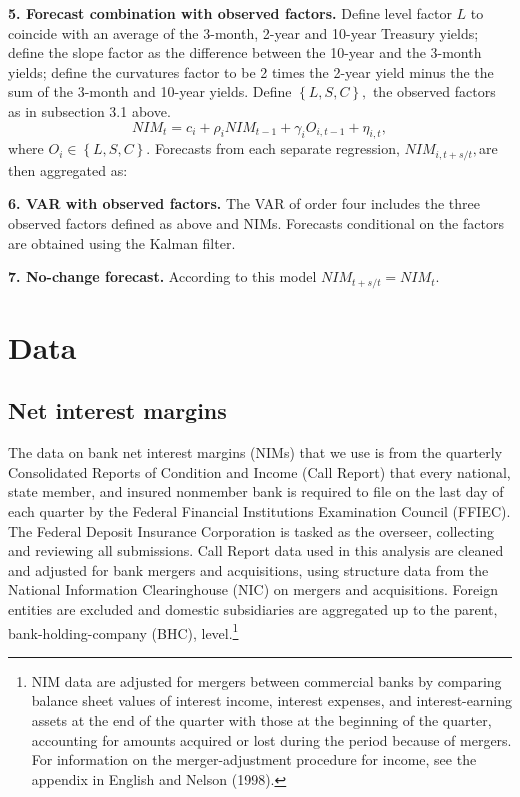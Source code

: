 \documentclass[11pt]{article}
\renewcommand{\baselinestretch}{1.5}
\begin{document}
\begin{frame}

\noindent \textbf{5. Forecast combination with observed factors.} Define level factor $L$ to coincide with an average of the 3-month, 2-year and 10-year Treasury yields; define the slope factor as the difference between the 10-year and the 3-month yields; define the curvatures factor to be 2 times the 2-year yield minus the the sum of the 3-month and 10-year yields. Define $\left\{L,S,C \right\} ,$ the observed factors as in subsection 3.1 above.
\[
NIM_{t}=c_{i}+\rho _{i}NIM_{t-1}+\gamma _{i}O_{i,t-1}+{\eta _{i,t},}
\]%
where $O_{i}\in \left\{ L,S,C\right\} .$ Forecasts  from each separate regression, $NIM_{i,t+s/t},$are then aggregated as:

\noindent \textbf{6. VAR with observed factors.}  The VAR of order four includes the three observed factors defined as above and NIMs. Forecasts conditional on the factors are obtained using the Kalman filter.


\noindent \textbf{7. No-change forecast.} According to this model $NIM_{t+s/t}=NIM_{t}${\normalsize . }



\section{Data}

\vspace{-0.1in}

\subsection{Net interest margins}

\vspace{-0.1in} The data on bank net interest margins (NIMs) that we use is from the quarterly Consolidated Reports of Condition and Income (Call Report) that every national, state member, and insured nonmember bank is required to file on the last day of each quarter by the Federal Financial Institutions Examination Council (FFIEC). The Federal Deposit Insurance Corporation is tasked as the overseer, collecting and reviewing all submissions. Call Report data used in this analysis are cleaned and adjusted for bank mergers and acquisitions, using structure data from the National Information Clearinghouse (NIC) on mergers and acquisitions. Foreign entities are excluded and domestic subsidiaries are aggregated up to the parent, bank-holding-company (BHC), level.\renewcommand{\baselinestretch}{1}\footnote{NIM data are adjusted for mergers between commercial banks by comparing balance sheet values of interest income, interest expenses, and interest-earning assets at the end of the quarter with those at the beginning of the quarter, accounting for amounts acquired or lost during the period because of mergers. For information on the merger-adjustment procedure for income, see the appendix in English and Nelson (1998).\vspace{0.05in}}\renewcommand{\baselinestretch}{1.5}


\end{frame}
\end{document}
